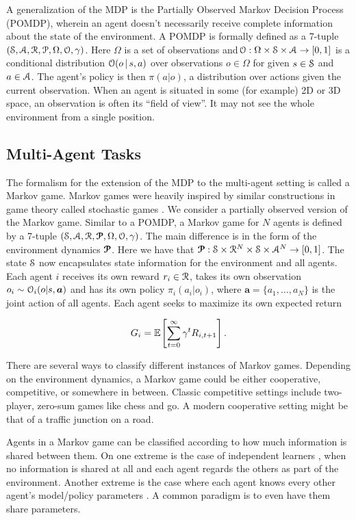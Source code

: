 \documentclass[12pt,journal,compsoc]{IEEEtran}
\begin{document}
	A generalization of the MDP is the Partially Observed Markov Decision Process (POMDP), wherein an agent doesn't necessarily receive complete information about the state of the environment. A POMDP is formally defined as a 7-tuple $(\S, \A, \R, \P, \Omega, \O, \gamma)$. Here $\Omega$ is a set of observations and $\!\O:\Omega \cross \S \cross \A \to [0,1]$ is a conditional distribution $\O(o\,|\,s,a)$ over observations $o\in \Omega$ for given $s\in\S$ and $a\in\A$. The agent's policy is then $\pi(a|o)$, a distribution over actions given the current observation. When an agent is situated in some (for example) 2D or 3D space, an observation is often its ``field of view''. It may not see the whole environment from a single position.
	
	\subsection{Multi-Agent Tasks}
	The formalism for the extension of the MDP to the multi-agent setting is called a Markov game. Markov games were heavily inspired by similar constructions in game theory called stochastic games \cite{stochastic_games}. We consider a partially observed version of the Markov game. Similar to a POMDP, a Markov game for $N$ agents is defined by a 7-tuple $(\S, \A, \R, \bm{\P}, \Omega, \O, \gamma)$. The main difference is in the form of the environment dynamics $\bm{\P}$. Here we have that $\bm{\P}:\S \cross \R^N \cross \S \cross \A^N \to [0,1]$. The state $\S$ now encapsulates state information for the environment and all agents. Each agent $i$ receives its own reward $r_i \in \R$, takes its own observation $o_i \sim \O_i(o|s,\bm{a})$ and has its own policy $\pi_i(a_i|o_i)$, where $\bm{a}=\{a_1, \dots, a_N\}$ is the joint action of all agents. Each agent seeks to maximize its own expected return
	
	\[G_{i} = \mathbb{E}_{\,\!\!}\left[\sum\limits_{t=0}^{\infty} \gamma^t R_{i,t+1}\right].\]
	
	There are several ways to classify different instances of Markov games. Depending on the environment dynamics, a Markov game could be either cooperative, competitive, or somewhere in between. Classic competitive settings include two-player, zero-sum games like chess and go. A modern cooperative setting might be that of a traffic junction on a road. 
	
	Agents in a Markov game can be classified according to how much information is shared between them. On one extreme is the case of independent learners \cite{bansal_mujoco}\!\cite{leibo_social_dilemmas}\!\cite{tampuu_pong}, when no information is shared at all and each agent regards the others as part of the environment. Another extreme is the case where each agent knows every other agent's model/policy parameters \cite{lola}. A common paradigm is to even have them share parameters.
	
\end{document}
